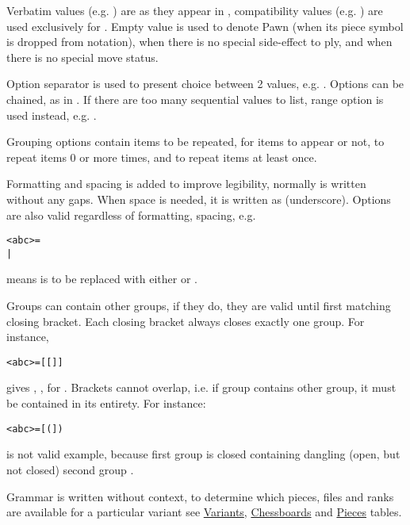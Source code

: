 Verbatim values (e.g. ) are as they appear in , compatibility
values (e.g. ) are used exclusively for . Empty value
 is used to denote Pawn (when its piece symbol is dropped from notation),
when there is no special side-effect to ply, and when there is no special move
status.

Option separator \algfmt{|} is used to present choice between 2 values, e.g.
 \algfmt{|} . Options can be chained, as in
 \algfmt{|} \alg{+} \algfmt{|} \alg{\#}. If there are too many
sequential values to list, range option  is used instead, e.g.
  .

Grouping options contain items to be repeated, \algfmt{[ ]} for items to appear
or not, \algfmt{( )} to repeat items 0 or more times, and \algfmt{\{ \}} to repeat
items at least once.

Formatting and spacing is added to improve legibility, normally  is
written without any gaps. When space is needed, it is written as \alg{\_}
(underscore). Options are also valid regardless of formatting, spacing, e.g.
\begin{alltt}
<abc> = 
  | 
\end{alltt}
means  is to be replaced with either  or .

Groups can contain other groups, if they do, they are valid until first matching
closing bracket. Each closing bracket always closes exactly one group. For instance,
\begin{alltt}
<abc> = [[]]
\end{alltt}
gives , ,  for .
Brackets cannot overlap, i.e. if group contains other group, it must be contained in
its entirety. For instance:
\begin{alltt}
<abc> = [(])
\end{alltt}
is not valid example, because first group \algfmt{[ ]} is closed containing
dangling (open, but not closed) second group \algfmt{( )}.

Grammar is written without context, to determine which pieces, files and ranks
are available for a particular variant see
\hyperref[tbl:Appendix/Introduction/Variants]{Variants},
\hyperref[tbl:Appendix/Introduction/Chessboards]{Chessboards} and
\hyperref[tbl:Appendix/Introduction/Pieces]{Pieces} tables.

